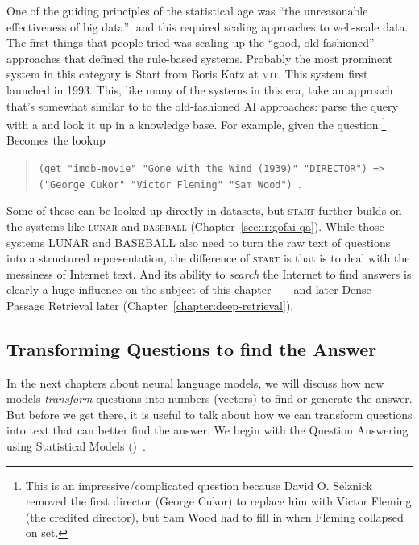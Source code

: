 One of the guiding principles of the statistical age was ``the
unreasonable effectiveness of big data'', and this required scaling 
approaches to web-scale data.
%
The first things that people tried was scaling up the ``good,
old-fashioned'' approaches that defined the rule-based systems.
%
Probably the most prominent system in this category is Start from Boris Katz
at \textsc{mit}.  This system first launched in 1993.
%
This, like many of the systems in
this era, take an approach that’s somewhat similar to to the old-fashioned AI
approaches: parse the query with a and look it up in a knowledge base.
%
For example, given the question:\footnote{This is an impressive/complicated question
    because David O. Selznick removed the first director (George Cukor) to
    replace him with Victor Fleming (the credited director), but Sam Wood had
    to fill in when Fleming collapsed on set.}
%
%
Becomes the lookup
\begin{quote}
  \texttt{(get "imdb-movie" "Gone with the Wind (1939)" "DIRECTOR") =>
    ("George Cukor" "Victor Fleming" "Sam Wood")}~\citep{katz-02}.
\end{quote}
%
Some of these can be looked up directly in datasets, but \textsc{start}
further builds on the systems like \textsc{lunar} and \textsc{baseball}
(Chapter~\ref{sec:ir:gofai-qa}).
%
While those systems LUNAR and
BASEBALL also need to turn the raw text of questions into a structured
representation, the difference of \textsc{start} is that
is to deal with the
messiness of Internet text.
%
And its ability to \emph{search} the
Internet to find answers is clearly a huge influence on the subject of this
chapter---\watson{}---and later Dense Passage
Retrieval later (Chapter~\ref{chapter:deep-retrieval}).

\subsection{Transforming Questions to find the Answer}


In the next chapters about neural language models, we will discuss how new
models \emph{transform} questions into numbers (vectors) to find or generate
the answer.
%
But before we get there, it is useful to talk about how we can transform
questions into text that can better find the answer.
%
We begin with the Question Answering using Statistical Models ()~\citep{radev-01}.

